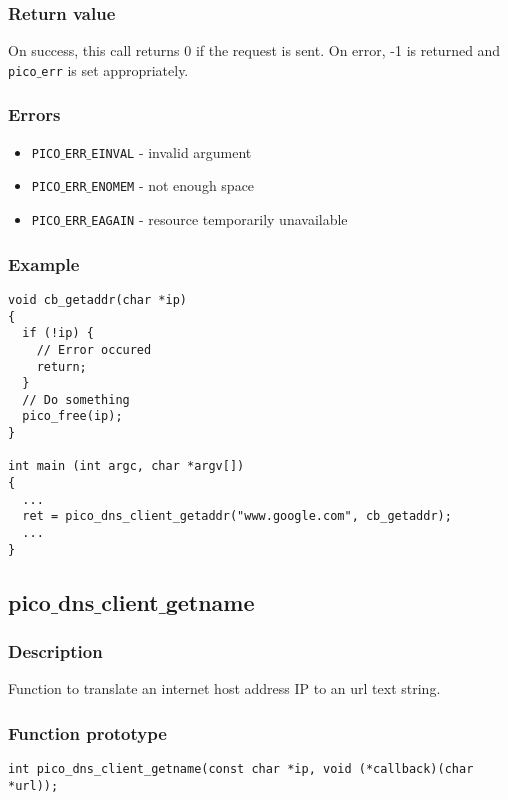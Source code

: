 \subsubsection*{Return value}
On success, this call returns 0 if the request is sent.
On error, -1 is returned and \texttt{pico$\_$err} is set appropriately.

\subsubsection*{Errors}
\begin{itemize}[noitemsep]
\item \texttt{PICO$\_$ERR$\_$EINVAL} - invalid argument
\item \texttt{PICO$\_$ERR$\_$ENOMEM} - not enough space
\item \texttt{PICO$\_$ERR$\_$EAGAIN} - resource temporarily unavailable
\end{itemize}

\subsubsection*{Example}
\begin{verbatim}
void cb_getaddr(char *ip)
{
  if (!ip) {
    // Error occured
    return;
  }
  // Do something
  pico_free(ip);
}

int main (int argc, char *argv[])
{
  ...
  ret = pico_dns_client_getaddr("www.google.com", cb_getaddr);
  ...
}
\end{verbatim}



\subsection{pico$\_$dns$\_$client$\_$getname}

\subsubsection*{Description}
Function to translate an internet host address IP to an url text string.

\subsubsection*{Function prototype}
\begin{verbatim}
int pico_dns_client_getname(const char *ip, void (*callback)(char *url));
\end{verbatim}

